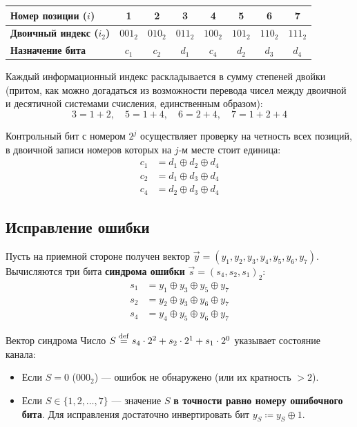 \documentclass[11pt,a4paper]{article}
\begin{document}
\begin{table}[h!]
\centering
\begin{tabular}{@{}lccccccc@{}}
\toprule
\textbf{Номер позиции ($i$)} & \textbf{1} & \textbf{2} & \textbf{3} & \textbf{4} & \textbf{5} & \textbf{6} & \textbf{7} \\ \midrule
\textbf{Двоичный индекс ($i_2$)} & $001_2$ & $010_2$ & $011_2$ & $100_2$ & $101_2$ & $110_2$ & $111_2$ \\
\textbf{Назначение бита} & $c_1$ & $c_2$ & $d_1$ & $c_4$ & $d_2$ & $d_3$ & $d_4$ \\ \bottomrule
\end{tabular}
\end{table}

Каждый информационный индекс раскладывается в сумму степеней двойки (притом, как можно догадаться из возможности перевода чисел между двоичной и десятичной системами счисления, единственным образом):
$$3 = 1 + 2, \quad 5 = 1 + 4, \quad 6 = 2 + 4, \quad 7 = 1 + 2 + 4$$

Контрольный бит с номером $2^j$ осуществляет проверку на четность всех позиций, в двоичной записи номеров которых на $j$-м месте стоит единица:
\begin{align*}
    c_1 &= d_1 \oplus d_2 \oplus d_4 \\
    c_2 &= d_1 \oplus d_3 \oplus d_4 \\
    c_4 &= d_2 \oplus d_3 \oplus d_4
\end{align*}

\subsection{Исправление ошибки}
Пусть на приемной стороне получен вектор $\vec{y} = (y_1, y_2, y_3, y_4, y_5, y_6, y_7)$. Вычисляются три бита \textbf{синдрома ошибки} $\vec{s} = (s_4, s_2, s_1)_2$:
\begin{align*}
    s_1 &= y_1 \oplus y_3 \oplus y_5 \oplus y_7 \\
    s_2 &= y_2 \oplus y_3 \oplus y_6 \oplus y_7 \\
    s_4 &= y_4 \oplus y_5 \oplus y_6 \oplus y_7
\end{align*}

\begin{definitionbox}{Вектор синдрома}
Число $S \overset{\mathrm{def}}{=} s_4 \cdot 2^2 + s_2 \cdot 2^1 + s_1 \cdot 2^0$ указывает состояние канала:
\begin{itemize}
    \item Если $S = 0$ ($000_2$) --- ошибок не обнаружено (или их кратность $> 2$).
    \item Если $S \in \{1, 2, \dots, 7\}$ --- значение $S$ \textbf{в точности равно номеру ошибочного бита}. Для исправления достаточно инвертировать бит $y_S \coloneqq y_S \oplus 1$.
\end{itemize}
\end{definitionbox}
\end{document}
